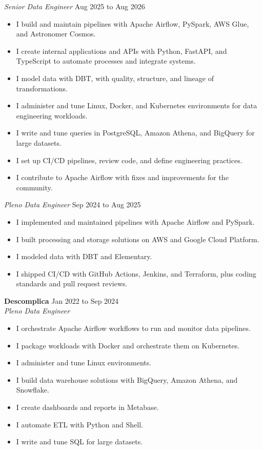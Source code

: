 \documentclass[a4paper,10pt]{article}
\begin{document}
\textit{Senior Data Engineer} \hfill Aug 2025 to Aug 2026
\begin{itemize}
    \item I build and maintain pipelines with Apache Airflow, PySpark, AWS Glue, and Astronomer Cosmos.
    \item I create internal applications and APIs with Python, FastAPI, and TypeScript to automate processes and integrate systems.
    \item I model data with DBT, with quality, structure, and lineage of transformations.
    \item I administer and tune Linux, Docker, and Kubernetes environments for data engineering workloads.
    \item I write and tune queries in PostgreSQL, Amazon Athena, and BigQuery for large datasets.
    \item I set up CI/CD pipelines, review code, and define engineering practices.
    \item I contribute to Apache Airflow with fixes and improvements for the community.
\end{itemize}

\textit{Pleno Data Engineer} \hfill Sep 2024 to Aug 2025
\begin{itemize}
    \item I implemented and maintained pipelines with Apache Airflow and PySpark.
    \item I built processing and storage solutions on AWS and Google Cloud Platform.
    \item I modeled data with DBT and Elementary.
    \item I shipped CI/CD with GitHub Actions, Jenkins, and Terraform, plus coding standards and pull request reviews.
\end{itemize}

\textbf{Descomplica} \hfill Jan 2022 to Sep 2024 \\
\textit{Pleno Data Engineer}
\begin{itemize}
    \item I orchestrate Apache Airflow workflows to run and monitor data pipelines.
    \item I package workloads with Docker and orchestrate them on Kubernetes.
    \item I administer and tune Linux environments.
    \item I build data warehouse solutions with BigQuery, Amazon Athena, and Snowflake.
    \item I create dashboards and reports in Metabase.
    \item I automate ETL with Python and Shell.
    \item I write and tune SQL for large datasets.
\end{itemize}
\end{document}
